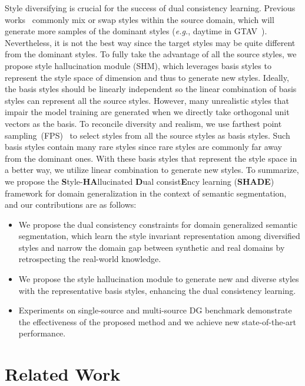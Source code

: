 \documentclass[runningheads]{llncs}
\def\eg{\emph{e.g.}} \def\Eg{\emph{E.g.}}
\newcommand{\ours}{SHADE\xspace}
\begin{document}
Style diversifying is crucial for the success of dual consistency learning.
Previous works~\cite{crossnorm,zhou2021mixstyle} commonly mix or swap styles within the source domain, which will generate more samples of the dominant styles (\eg, daytime in GTAV~\cite{gtav}). Nevertheless, it is not the best way since the target styles may be quite different from the dominant styles. 
To fully take the advantage of all the source styles, we propose style hallucination module (SHM), which leverages  basis styles to represent the style space of  dimension and thus to generate new styles. 
Ideally, the basis styles should be linearly independent so the linear combination of basis styles can represent all the source styles. 
However, many unrealistic styles that impair the model training are generated when we directly take  orthogonal unit vectors as the basis. To reconcile diversity and realism, we use farthest point sampling~(FPS)~\cite{qi2017pointnet++} to select  styles from all the source styles as basis styles. 
Such basis styles contain many rare styles since rare styles are commonly far away from the dominant ones. With these basis styles that represent the style space in a better way, we utilize linear combination to generate new styles.
To summarize, we propose the \textbf{S}tyle-\textbf{HA}llucinated \textbf{D}ual consist\textbf{E}ncy learning (\textbf{\ours}) framework for domain generalization in the context of semantic segmentation, and our contributions are as follows:
\begin{itemize}
    \item We propose the dual consistency constraints for domain generalized semantic segmentation, which learn the style invariant representation among diversified styles and narrow the domain gap between synthetic and real domains by retrospecting the real-world knowledge.
    \item We propose the style hallucination module to generate new and diverse styles with the representative basis styles, enhancing the dual consistency learning.
    \item Experiments on single-source and multi-source DG benchmark demonstrate the effectiveness of the proposed method and we achieve new state-of-the-art performance.
\end{itemize}

\section{Related Work}
\end{document}
